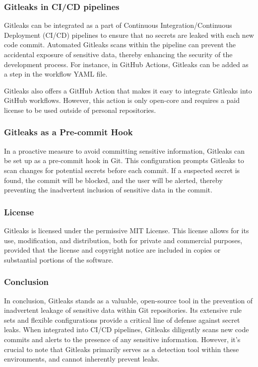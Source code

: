 \subsubsection{Gitleaks in CI/CD pipelines}\label{subsubsec:gitleaks-cicd}

Gitleaks can be integrated as a part of Continuous Integration/Continuous Deployment (CI/CD) pipelines to ensure that no secrets are leaked with each new code commit.
Automated Gitleaks scans within the pipeline can prevent the accidental exposure of sensitive data, thereby enhancing the security of the development process.
For instance, in GitHub Actions, Gitleaks can be added as a step in the workflow YAML file.

Gitleaks also offers a GitHub Action that makes it easy to integrate Gitleaks into GitHub workflows.
However, this action is only open-core and requires a paid license to be used outside of personal repositories.

\subsubsection{Gitleaks as a Pre-commit Hook}\label{subsubsec:gitleaks-precommit}

In a proactive measure to avoid committing sensitive information, Gitleaks can be set up as a pre-commit hook in Git.
This configuration prompts Gitleaks to scan changes for potential secrets before each commit.
If a suspected secret is found, the commit will be blocked, and the user will be alerted, thereby preventing the inadvertent inclusion of sensitive data in the commit.

\subsubsection{License}\label{subsubsec:gitleaks-license}

Gitleaks is licensed under the permissive MIT License.
This license allows for its use, modification, and distribution, both for private and commercial purposes, provided that the license and copyright notice are included in copies or substantial portions of the software.

\subsubsection{Conclusion}\label{subsubsec:gitleaks-conclusion}

In conclusion, Gitleaks stands as a valuable, open-source tool in the prevention of inadvertent leakage of sensitive data within Git repositories.
Its extensive rule sets and flexible configurations provide a critical line of defense against secret leaks.
When integrated into CI/CD pipelines, Gitleaks diligently scans new code commits and alerts to the presence of any sensitive information.
However, it's crucial to note that Gitleaks primarily serves as a detection tool within these environments, and cannot inherently prevent leaks.

